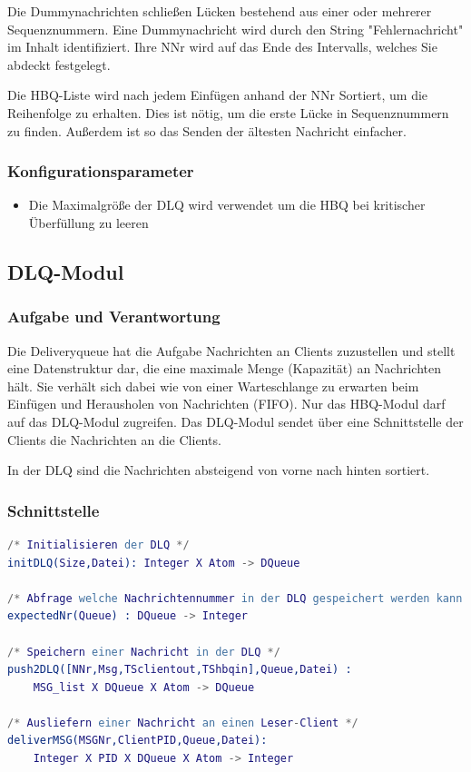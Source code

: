 \documentclass{article}
\begin{document}
Die Dummynachrichten schließen Lücken bestehend aus einer oder mehrerer Sequenznummern. Eine Dummynachricht wird durch
den String "Fehlernachricht" im Inhalt identifiziert. Ihre NNr wird auf das Ende des Intervalls, welches Sie abdeckt
festgelegt.

Die HBQ-Liste wird nach jedem Einfügen anhand der NNr Sortiert, um die Reihenfolge zu erhalten.
Dies ist nötig, um die erste Lücke in Sequenznummern zu finden. Außerdem ist so das Senden der
ältesten Nachricht einfacher.

\subsubsection{Konfigurationsparameter}
\begin{itemize}
	\item Die Maximalgröße der DLQ wird verwendet um die HBQ bei kritischer Überfüllung zu leeren
\end{itemize}
\newpage

\subsection{DLQ-Modul}
\subsubsection{Aufgabe und Verantwortung}
Die Deliveryqueue hat die Aufgabe Nachrichten an Clients zuzustellen und stellt eine Datenstruktur dar, die eine
maximale Menge (Kapazität) an Nachrichten hält. Sie verhält sich dabei wie von einer Warteschlange zu erwarten beim
Einfügen und Herausholen von Nachrichten (FIFO). Nur das HBQ-Modul darf auf das DLQ-Modul zugreifen. Das DLQ-Modul
sendet über eine Schnittstelle der Clients die Nachrichten an die Clients.

In der DLQ sind die Nachrichten absteigend von vorne nach hinten sortiert.

\subsubsection{Schnittstelle}
\begin{lstlisting}[language=erlang]
/* Initialisieren der DLQ */
initDLQ(Size,Datei): Integer X Atom -> DQueue

/* Abfrage welche Nachrichtennummer in der DLQ gespeichert werden kann */
expectedNr(Queue) : DQueue -> Integer

/* Speichern einer Nachricht in der DLQ */
push2DLQ([NNr,Msg,TSclientout,TShbqin],Queue,Datei) :
    MSG_list X DQueue X Atom -> DQueue

/* Ausliefern einer Nachricht an einen Leser-Client */
deliverMSG(MSGNr,ClientPID,Queue,Datei):
    Integer X PID X DQueue X Atom -> Integer
\end{lstlisting}
\end{document}
